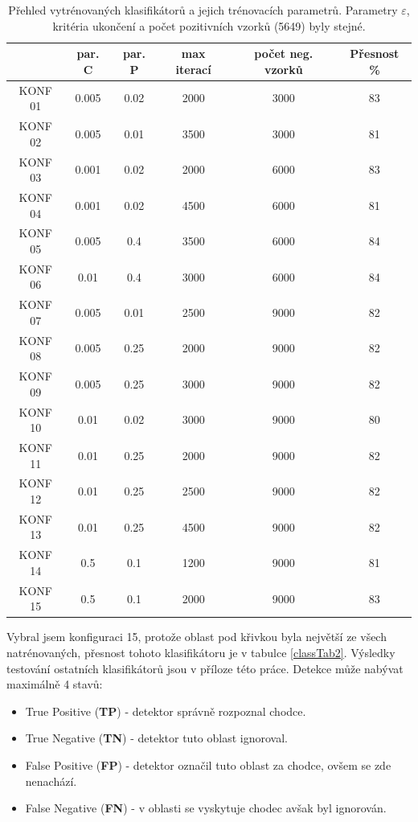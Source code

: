 \begin{table}[H]
\centering
\caption{Přehled vytrénovaných klasifikátorů a jejich trénovacích parametrů. Parametry $\varepsilon$, kritéria ukončení a počet pozitivních vzorků (5649) byly stejné.}
\begin{tabular} { |c|c|c|c|c|c| }
\hline
{}          & {par. C} & {par. P}    & {max iterací} & {počet neg. vzorků} & {Přesnost \%}  \\ \hline
KONF 01		& 	0.005	& 	  0.02	 &   2000   	 &		  3000   	   &     83	 		\\ \hline
KONF 02		& 	0.005	& 	  0.01	 &   3500   	 &		  3000   	   &     81	 		\\ \hline
KONF 03		& 	0.001	& 	  0.02	 &   2000   	 &		  6000   	   &     83	 		\\ \hline
KONF 04		& 	0.001	& 	  0.02	 &   4500   	 &		  6000   	   &     81	 		\\ \hline
KONF 05		& 	0.005	& 	  0.4 	 &   3500   	 &		  6000   	   &     84	 		\\ \hline
KONF 06		& 	0.01 	& 	  0.4 	 &   3000   	 &		  6000   	   &     84	 		\\ \hline
KONF 07		& 	0.005	& 	  0.01	 &   2500   	 &		  9000   	   &     82	 		\\ \hline
KONF 08		& 	0.005	& 	  0.25	 &   2000   	 &		  9000   	   &     82	 		\\ \hline
KONF 09		& 	0.005	& 	  0.25	 &   3000   	 &		  9000   	   &     82	 		\\ \hline
KONF 10 	& 	0.01 	& 	  0.02	 &   3000   	 &		  9000   	   &     80	 		\\ \hline
KONF 11 	& 	0.01 	& 	  0.25	 &   2000   	 &		  9000   	   &     82	 		\\ \hline
KONF 12 	& 	0.01 	& 	  0.25	 &   2500   	 &		  9000   	   &     82	 		\\ \hline
KONF 13 	& 	0.01 	& 	  0.25	 &   4500   	 &		  9000   	   &     82	 		\\ \hline
KONF 14 	& 	0.5	 	& 	  0.1	 &   1200   	 &		  9000   	   &     81	 		\\ \hline
KONF 15 	& 	0.5		& 	  0.1	 &   2000   	 &		  9000   	   &     83	 		\\ \hline
\end{tabular}
\label{classTab1}
\end{table}

Vybral jsem konfiguraci 15, protože oblast pod křivkou byla největší ze všech natrénovaných, přesnost tohoto klasifikátoru je v tabulce \ref{classTab2}. Výsledky testování ostatních klasifikátorů jsou v příloze této práce. Detekce může nabývat maximálně 4 stavů:
\begin{itemize}
	\item{True Positive (\textbf{TP}) - detektor správně rozpoznal chodce.}
	\item{True Negative (\textbf{TN}) - detektor tuto oblast ignoroval.}
	\item{False Positive (\textbf{FP}) - detektor označil tuto oblast za chodce, ovšem se zde nenachází.}
	\item{False Negative (\textbf{FN}) - v oblasti se vyskytuje chodec avšak byl ignorován.}
\end{itemize}

